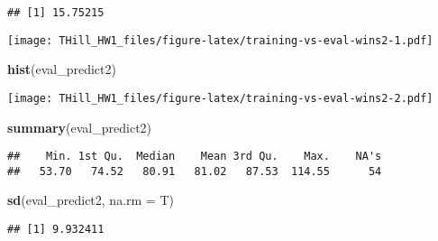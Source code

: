 \documentclass[
]{article}
\newenvironment{Shaded}{\begin{snugshade}}{\end{snugshade}}
\newcommand{\DataTypeTok}[1]{\textcolor[rgb]{0.13,0.29,0.53}{#1}}
\newcommand{\DecValTok}[1]{\textcolor[rgb]{0.00,0.00,0.81}{#1}}
\newcommand{\KeywordTok}[1]{\textcolor[rgb]{0.13,0.29,0.53}{\textbf{#1}}}
\newcommand{\NormalTok}[1]{#1}
\newcommand{\OperatorTok}[1]{\textcolor[rgb]{0.81,0.36,0.00}{\textbf{#1}}}
\newcommand{\StringTok}[1]{\textcolor[rgb]{0.31,0.60,0.02}{#1}}
\begin{document}
\begin{verbatim}
## [1] 15.75215
\end{verbatim}

\begin{Shaded}
\end{Shaded}

\texttt{[image: THill\_HW1\_files/figure-latex/training-vs-eval-wins2-1.pdf]}

\begin{Shaded}
\begin{Highlighting}[]
\KeywordTok{hist}\NormalTok{(eval\_predict2)}
\end{Highlighting}
\end{Shaded}

\texttt{[image: THill\_HW1\_files/figure-latex/training-vs-eval-wins2-2.pdf]}

\begin{Shaded}
\begin{Highlighting}[]
\KeywordTok{summary}\NormalTok{(eval\_predict2)}
\end{Highlighting}
\end{Shaded}

\begin{verbatim}
##    Min. 1st Qu.  Median    Mean 3rd Qu.    Max.    NA's 
##   53.70   74.52   80.91   81.02   87.53  114.55      54
\end{verbatim}

\begin{Shaded}
\begin{Highlighting}[]
\KeywordTok{sd}\NormalTok{(eval\_predict2, }\DataTypeTok{na.rm =}\NormalTok{ T)}
\end{Highlighting}
\end{Shaded}

\begin{verbatim}
## [1] 9.932411
\end{verbatim}

\begin{Shaded}
\end{Shaded}
\end{document}
